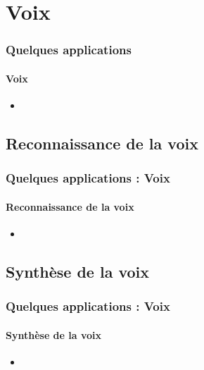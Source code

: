 \documentclass[xcolor=table]{beamer}
\begin{document}
\section{Voix}

\begin{frame}
	\frametitle{Quelques applications}
	\framesubtitle{Voix}
	\begin{itemize}
		\item 
	\end{itemize}
\end{frame}

\subsection{Reconnaissance de la voix}

\begin{frame}
	\frametitle{Quelques applications : Voix}
	\framesubtitle{Reconnaissance de la voix}
	\begin{itemize}
		\item 
	\end{itemize}
\end{frame}

\subsection{Synthèse de la voix}

\begin{frame}
	\frametitle{Quelques applications : Voix}
	\framesubtitle{Synthèse de la voix}
	\begin{itemize}
		\item 
	\end{itemize}
\end{frame}


\end{document}
